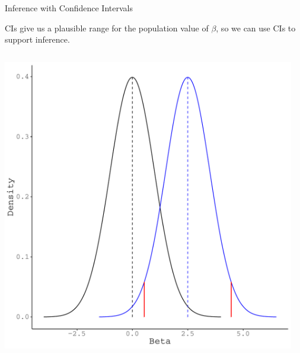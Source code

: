 \documentclass[10pt]{beamer}\usepackage[]{graphicx}\usepackage[]{color}
\makeatletter
\def\maxwidth{ %
  \ifdim\Gin@nat@width>\linewidth
    \linewidth
  \else
    \Gin@nat@width
  \fi
}
\newenvironment{knitrout}{}{} %
\makeatother
\begin{document}
\begin{frame}{Inference with Confidence Intervals}
  
  CIs give us a plausible range for the population value of $\beta$, so we can 
  use CIs to support inference.
  
\begin{columns}
  \begin{column}{0.5\textwidth}
    
\begin{knitrout}\footnotesize
{}\color{fgcolor}

{\centering \includegraphics[width=\maxwidth]{figure/unnamed-chunk-22-1} 

}


\end{knitrout}

\end{column}
\begin{column}{0.5\textwidth}
  
\begin{knitrout}\footnotesize
{}\color{fgcolor}


\end{knitrout}
\end{column}
\end{columns}
\end{frame}
\end{document}
